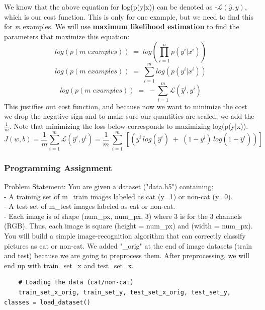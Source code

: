 \documentclass[11pt, a4paper]{article}
\begin{document}
\begin{spacing}{1.1}
	We know that the above equation for log(p(y$|$x)) can be denoted as -$\mathcal{L}(\hat{y},y)$, which is our cost function. This is only for one example, but we need to find this for \textit{m} examples. We will use \textbf{maximum likelihood estimation} to find the parameters that maximize this equation: $$ log(p(m\; examples))\; = \; log(\prod_{i=1}^{n} p(y^i|x^i)) $$ $$ log(p(m\; examples))\; = \; \sum_{i=1}^m log(p(y^i|x^i)) $$ $$ log(p(m\; examples))\; = \; -\sum_{i=1}^m \mathcal{L}(\hat{y}^i,y^i) $$ This justifies out cost function, and because now we want to minimize the cost we drop the negative sign and to make sure our quantities are scaled, we add the $\frac{1}{m}$. Note that minimizing the loss below corresponds to maximizing log(p(y$|$x)).  $$ J(w,b) = \frac{1}{m} \sum_{i=1}^{m} \mathcal{L}(\hat{y}^i,y^i) = \frac{1}{m}\, \sum_{i=1}^{m}\, [(y^i\,log(\hat{y}^i) \; + \; (1-y^i)\,log(1-\hat{y}^i))] $$
	\subsubsection{Programming Assignment}
	Problem Statement: You are given a dataset ("data.h5") containing: \\
	\hspace*{3mm} - A training set of m\_train images labeled as cat (y=1) or non-cat (y=0). \\
	\hspace*{3mm} - A test set of m\_test images labeled as cat or non-cat. \\
	\hspace*{3mm} - Each image is of shape (num\_px, num\_px, 3) where 3 is for the 3 channels (RGB). Thus, each image \hspace*{6mm} is square (height = num\_px) and (width = num\_px). \vspace*{1mm} \\
	You will build a simple image-recognition algorithm that can correctly classify pictures as cat or non-cat. We added "\_orig" at the end of image datasets (train and test) because we are going to preprocess them. After preprocessing, we will end up with train\_set\_x and test\_set\_x. 
	\begin{lstlisting}
	# Loading the data (cat/non-cat)
	train_set_x_orig, train_set_y, test_set_x_orig, test_set_y, classes = load_dataset() \end{lstlisting} \newpage


\end{spacing}
\end{document}
